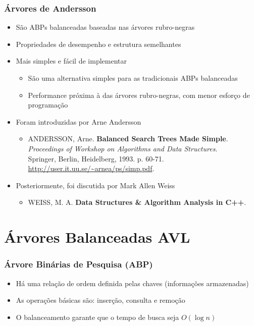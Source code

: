 \documentclass[aspectratio=169]{beamer}
\begin{document}
\begin{frame}\frametitle{Árvores de Andersson}
\begin{itemize}
	\item São ABPs balanceadas baseadas nas árvores rubro-negras\\
	\item Propriedades de desempenho e estrutura semelhantes\\
	\item Mais simples e fácil de implementar
	\begin{itemize}
		\item São uma alternativa simples para as tradicionais ABPs balanceadas
		\item Performance próxima à das árvores rubro-negras, com menor esforço de programação
	\end{itemize}
	\item Foram introduzidas por Arne Andersson
	\begin{itemize}
		\item	ANDERSSON, Arne. \textbf{Balanced Search Trees Made Simple}.\\
			\emph{Proceedings of Workshop on Algorithms and Data Structures}.\\
			Springer, Berlin, Heidelberg, 1993. p. 60-71.\\
			\url{http://user.it.uu.se/~arnea/ps/simp.pdf}.
	\end{itemize}
	\item Posteriormente, foi discutida por Mark Allen Weiss
	\begin{itemize}
		\item	WEISS, M. A. \textbf{Data Structures \& Algorithm Analysis in C++}.\\
	\end{itemize}
\end{itemize}
\end{frame}

\section{Árvores Balanceadas AVL}

\begin{frame}\frametitle{Árvore Binárias de Pesquisa (ABP)}
\begin{itemize}
	\item Há uma relação de ordem definida pelas chaves (informações armazenadas)
	\item As operações básicas são: inserção, consulta e remoção
	\item O balanceamento garante que o tempo de busca seja $O(\log{n})$
\end{itemize}
\end{frame}
\end{document}
